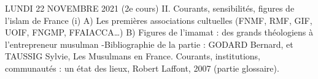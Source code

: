 LUNDI 22 NOVEMBRE 2021 (2e
cours)
II. Courants, sensibilités, figures de l’islam de France (i)
A) Les premières associations cultuelles (FNMF, RMF, GIF, UOIF, FNGMP,
FFAIACCA…)
B) Figures de l’imamat : des grands théologiens à l’entrepreneur musulman
-Bibliographie de la partie :
GODARD Bernard, et TAUSSIG Sylvie, Les Musulmans en France. Courants,
institutions, communautés : un état des lieux, Robert Laffont, 2007 (partie glossaire).